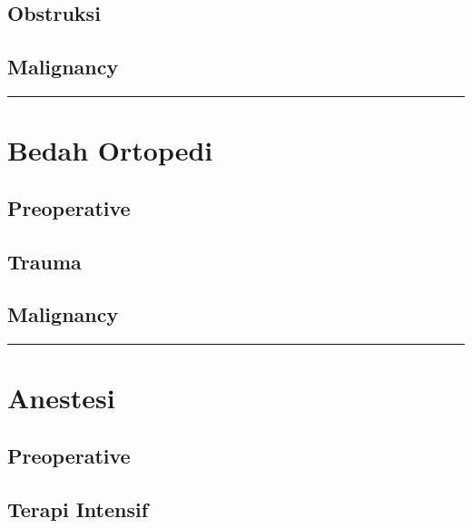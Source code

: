\documentclass[
]{book}
\begin{document}
\hypertarget{obstruksi-2}{%
\subsection{Obstruksi}\label{obstruksi-2}}

\hypertarget{malignancy-1}{%
\subsection{Malignancy}\label{malignancy-1}}

\begin{center}\rule{0.5\linewidth}{0.5pt}\end{center}

\hypertarget{bedah-ortopedi}{%
\section{Bedah Ortopedi}\label{bedah-ortopedi}}

\hypertarget{preoperative}{%
\subsection{Preoperative}\label{preoperative}}

\hypertarget{trauma}{%
\subsection{Trauma}\label{trauma}}

\hypertarget{malignancy-2}{%
\subsection{Malignancy}\label{malignancy-2}}

\begin{center}\rule{0.5\linewidth}{0.5pt}\end{center}

\hypertarget{anestesi-1}{%
\section{Anestesi}\label{anestesi-1}}

\hypertarget{preoperative-1}{%
\subsection{Preoperative}\label{preoperative-1}}

\hypertarget{terapi-intensif}{%
\subsection{Terapi Intensif}\label{terapi-intensif}}
\end{document}
